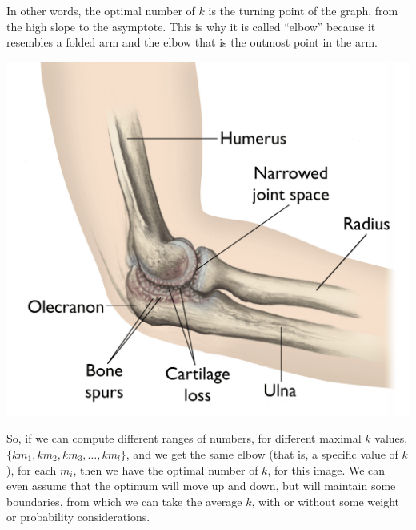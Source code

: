 \documentclass[12pt]{article}
\begin{document}
In other words, the optimal number of $k$ is the turning point of the graph, from the high slope to the asymptote. This is why it is called “elbow” because it resembles a folded arm and the elbow that is the outmost point in the arm. \newline

\includegraphics[width=0.38\columnwidth]{elbow-oa---final.png} \newline

So, if we can compute different ranges of numbers, for different maximal $k$ values, \( \{k{m_1},k{m_2},k{m_3},…,k{m_l} \} \), and we get the same elbow (that is, a specific value of $k$), for each \( m_i \), then we have the optimal number of $k$, for this image. We can even assume that the optimum will move up and down, but will maintain some boundaries, from which we can take the average $k$, with or without some weight or probability considerations. \newline
\end{document}
